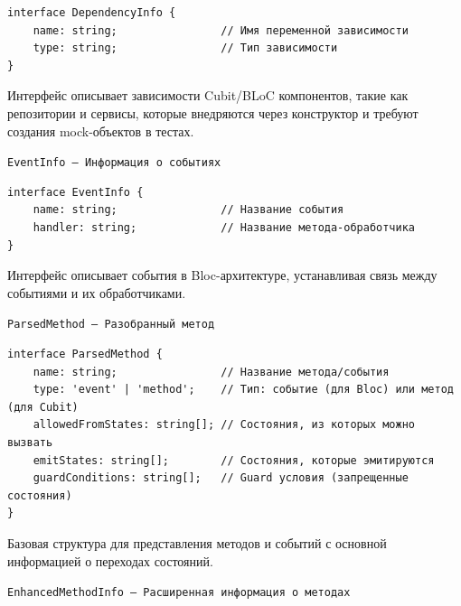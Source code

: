 \documentclass[14pt, russian]{scrartcl}
\begin{document}
\begin{verbatim}
interface DependencyInfo {
    name: string;                // Имя переменной зависимости
    type: string;                // Тип зависимости
}
\end{verbatim}

Интерфейс описывает зависимости Cubit/BLoC компонентов, такие как репозитории и сервисы, которые внедряются через конструктор и требуют создания mock-объектов в тестах.

\texttt{EventInfo — Информация о событиях}

\begin{verbatim}
interface EventInfo {
    name: string;                // Название события
    handler: string;             // Название метода-обработчика
}
\end{verbatim}

Интерфейс описывает события в Bloc-архитектуре, устанавливая связь между событиями и их обработчиками.

\texttt{ParsedMethod — Разобранный метод}

\begin{verbatim}
interface ParsedMethod {
    name: string;                // Название метода/события
    type: 'event' | 'method';    // Тип: событие (для Bloc) или метод (для Cubit)
    allowedFromStates: string[]; // Состояния, из которых можно вызвать
    emitStates: string[];        // Состояния, которые эмитируются
    guardConditions: string[];   // Guard условия (запрещенные состояния)
}
\end{verbatim}

Базовая структура для представления методов и событий с основной информацией о переходах состояний.

\texttt{EnhancedMethodInfo — Расширенная информация о методах}
\end{document}
